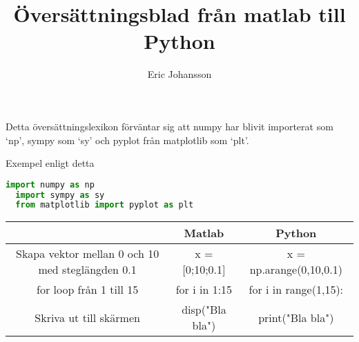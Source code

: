\documentclass[a4paper]{article}
\author{Eric Johansson}
\title{Översättningsblad från matlab till Python}
\begin{document}
\maketitle
Detta översättningslexikon förväntar sig att numpy har blivit 
importerat som `np', sympy som `sy' och pyplot från matplotlib som `plt'. 

Exempel enligt detta 
\begin{lstlisting}[language=Python]
  import numpy as np
  import sympy as sy
  from matplotlib import pyplot as plt
\end{lstlisting}

\begin{center}
\begin{tabular}{|c | c | c|}
    \hline
    & Matlab & Python \\
    \hline
    Skapa vektor mellan 0 och 10 med steglängden 0.1 & x = [0;10;0.1] & x = np.arange(0,10,0.1) \\
    \hline
        for loop från 1 till 15                      & for i in 1:15 & for i in range(1,15): \\
    \hline
        Skriva ut till skärmen & disp("Bla bla") & print("Bla bla") \\
    \hline

\end{tabular}
\end{center}
\end{document}
